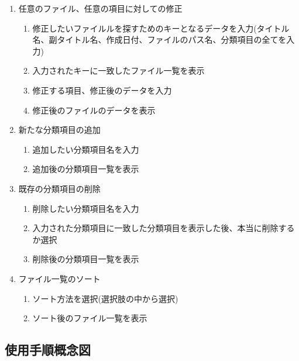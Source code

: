\documentclass[a4j]{jarticle}
\begin{document}
\begin{enumerate}
\begin{enumerate}
\item 任意のファイル、任意の項目に対しての修正
\begin{enumerate}
\item 修正したいファイルルを探すためのキーとなるデータを入力(タイトル名、副タイトル名、作成日付、ファイルのパス名、分類項目の全てを入力)
\item 入力されたキーに一致したファイル一覧を表示
\item 修正する項目、修正後のデータを入力
\item 修正後のファイルのデータを表示
\end{enumerate}

\item 新たな分類項目の追加
\begin{enumerate}
\item 追加したい分類項目名を入力
\item 追加後の分類項目一覧を表示
\end{enumerate}

\item 既存の分類項目の削除
\begin{enumerate}
\item 削除したい分類項目名を入力
\item 入力された分類項目に一致した分類項目を表示した後、本当に削除するか選択
\item 削除後の分類項目一覧を表示
\end{enumerate}

\item ファイル一覧のソート
\begin{enumerate}
\item ソート方法を選択(選択肢の中から選択)
\item ソート後のファイル一覧を表示
\end{enumerate}
\end{enumerate}
\end{enumerate}

\subsection{使用手順概念図}

\newpage
\end{document}
